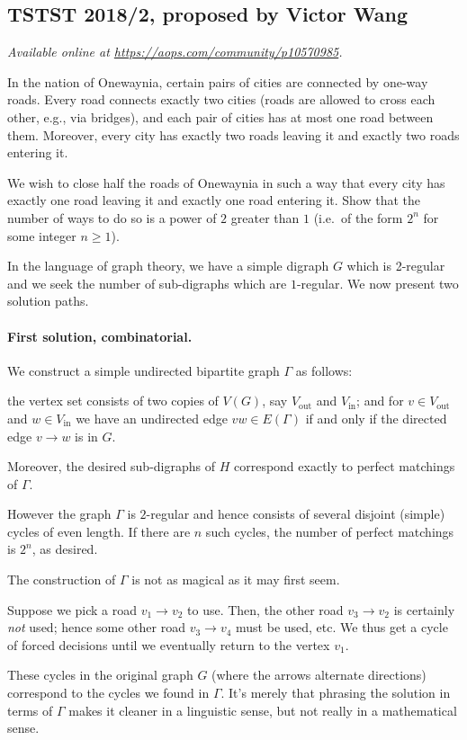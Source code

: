 \documentclass[11pt]{scrartcl}
\begin{document}
\subsection{TSTST 2018/2, proposed by Victor Wang}
\textsl{Available online at \url{https://aops.com/community/p10570985}.}
\begin{mdframed}[style=mdpurplebox,frametitle={Problem statement}]
In the nation of Onewaynia,
certain pairs of cities are connected by one-way roads.
Every road connects exactly two cities
(roads are allowed to cross each other, e.g., via bridges),
and each pair of cities has at most one road between them.
Moreover, every city has exactly two roads leaving it and
exactly two roads entering it.

We wish to close half the roads of Onewaynia in such a way that
every city has exactly one road leaving it and exactly one road entering it.
Show that the number of ways to do so is a power of $2$ greater than $1$
(i.e.\ of the form $2^n$ for some integer $n \ge 1$).
\end{mdframed}
In the language of graph theory, we have a simple digraph $G$
which is 2-regular and we seek the
number of sub-digraphs which are $1$-regular.
We now present two solution paths.

\paragraph{First solution, combinatorial.}
We construct a simple undirected bipartite graph $\Gamma$ as follows:
\begin{itemize}
  \ii the vertex set consists of two copies of $V(G)$,
  say $V_{\text{out}}$ and $V_{\text{in}}$; and
  \ii for $v \in V_{\text{out}}$ and $w \in V_{\text{in}}$
  we have an undirected edge $vw \in E(\Gamma)$
  if and only if the directed edge $v \to w$ is in $G$.
\end{itemize}
Moreover, the desired sub-digraphs of $H$ correspond exactly
to perfect matchings of $\Gamma$.

However the graph $\Gamma$ is $2$-regular
and hence consists of several disjoint (simple) cycles of even length.
If there are $n$ such cycles, the number of perfect matchings
is $2^n$, as desired.

\begin{remark*}
  The construction of $\Gamma$ is not as magical as it may first seem.

  Suppose we pick a road $v_1 \to v_2$ to use.
  Then, the other road $v_3 \to v_2$ is certainly \emph{not} used;
  hence some other road $v_3 \to v_4$ must be used, etc.
  We thus get a cycle of forced decisions until
  we eventually return to the vertex $v_1$.

  These cycles in the original graph $G$
  (where the arrows alternate directions)
  correspond to the cycles we found in $\Gamma$.
  It's merely that phrasing the solution in terms of $\Gamma$
  makes it cleaner in a linguistic sense,
  but not really in a mathematical sense.
\end{remark*}
\end{document}
